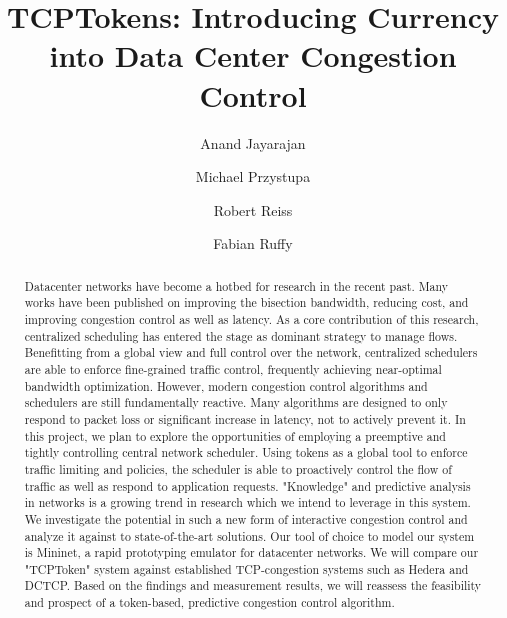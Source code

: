 \documentclass[sigconf]{acmart}
\begin{document}
\title{TCPTokens: Introducing Currency into Data Center Congestion Control}

\author{Anand Jayarajan}

\author{Michael Przystupa}

\author{Robert Reiss}

\author{Fabian Ruffy}

\begin{abstract}
Datacenter networks have become a hotbed for research in the recent past. Many works have been published on improving the bisection bandwidth, reducing cost, and improving congestion control as well as latency. As a core contribution of this research, centralized scheduling has entered the stage as dominant strategy to manage flows. Benefitting from a global view and full control over the network, centralized schedulers are able to enforce fine-grained traffic control, frequently achieving near-optimal bandwidth optimization. However, modern congestion control algorithms and schedulers are still fundamentally reactive. Many algorithms are designed to only respond to packet loss or significant increase in latency, not to actively prevent it.
In this project, we plan to explore the opportunities of employing a preemptive and tightly controlling central network scheduler. Using tokens as a global tool to enforce traffic limiting and policies, the scheduler is able to proactively control the flow of traffic as well as respond to application requests. "Knowledge" and predictive analysis in networks is a growing trend in research which we intend to leverage in this system.
We investigate the potential in such a new form of interactive congestion control and analyze it against to state-of-the-art solutions. Our tool of choice to model our system is Mininet, a rapid prototyping emulator for datacenter networks. We will compare our "TCPToken" system against established TCP-congestion systems such as Hedera and DCTCP. Based on the findings and measurement results, we will reassess the feasibility and prospect of a token-based, predictive congestion control algorithm.
\end{abstract}




\maketitle





%







 
\end{document}
